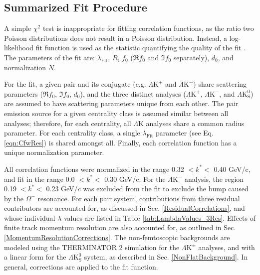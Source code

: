 \documentclass[ALICE,manyauthors]{cernphprep}
\newcommand{\LamK}{$\Lambda$K\xspace}
\newcommand{\LamKchP}{$\Lambda\mathrm{K^{+}}$\xspace}
\newcommand{\ALamKchM}{$\bar{\Lambda}\mathrm{K^{-}}$\xspace}
\newcommand{\LamKchM}{$\Lambda\mathrm{K^{-}}$\xspace}
\newcommand{\LamKpm}{$\Lambda\mathrm{K^{\pm}}$\xspace}
\newcommand{\LamKs}{$\Lambda\mathrm{K^{0}_{S}}$\xspace}
\begin{document}
\subsection{Summarized Fit Procedure}
\label{SummarizedFitProcedure}


A simple $\chi^{2}$ test is inappropriate for fitting correlation functions, as the ratio two Poisson distributions does not result in a Poisson distribution.
Instead, a log-likelihood fit function is used as the statistic quantifying the quality of the fit \cite{Lisa:2005dd}.
The parameters of the fit are: $\lambda_{\mathrm{Fit}}$, $R$, $f_{0}$ ($\Re f_{0}$ and $\Im f_{0}$ separately), $d_{0}$, and normalization $N$.

For the fit, a given pair and its conjugate (e.g. \LamKchP and \ALamKchM) share scattering parameters ($\Re f_{0}$, $\Im f_{0}$, $d_{0}$), and the three distinct analyses (\LamKchP, \LamKchM, and \LamKs) are assumed to have scattering parameters unique from each other.
The pair emission source for a given centrality class is assumed similar between all analyses; therefore, for each centrality, all \LamK analyses share a common radius parameter.
For each centrality class, a single $\lambda_{\mathrm{Fit}}$ parameter (see Eq. \ref{eqn:CfwRes}) is shared amongst all.
Finally, each correlation function has a unique normalization parameter.

All correlation functions were normalized in the range 0.32 $< k^{*} <$ 0.40 GeV/c, and fit in the range 0.0 $< k^{*} <$ 0.30 GeV/c.
For the \LamKchM analysis, the region 0.19 $< k^{*} <$ 0.23 GeV/$c$ was excluded from the fit to exclude the bump caused by the $\Omega^{-}$ resonance.
For each pair system, contributions from three residual contributors are accounted for, as discussed in Sec. \ref{ResidualCorrelations}, and whose individual $\lambda$ values are listed in Table \ref{tab:LambdaValues_3Res}.
Effects of finite track momentum resolution are also accounted for, as outlined in Sec. \ref{MomentumResolutionCorrections}.
The non-femtoscopic backgrounds are modeled using the THERMINATOR 2 simulation for the \LamKpm analyses, and with a linear form for the \LamKs system, as described in Sec. \ref{NonFlatBackground}.
In general, corrections are applied to the fit function.
\end{document}
